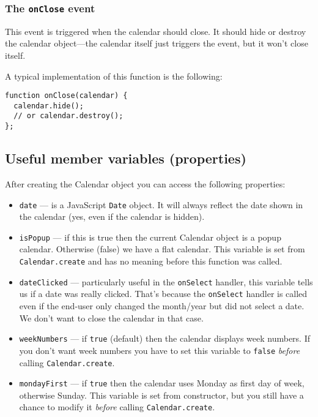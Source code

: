 \documentclass[a4paper,10pt]{article}
\begin{document}
\subsubsection*{The \texttt{onClose} event}\label{sec:Calendar.onClose}

This event is triggered when the calendar should close.  It should hide or
destroy the calendar object---the calendar itself just triggers the event, but
it won't close itself.

A typical implementation of this function is the following:

\begin{verbatim}
function onClose(calendar) {
  calendar.hide();
  // or calendar.destroy();
};
\end{verbatim}

\subsection{Useful member variables (properties)}\label{sec:Calendar.props}

After creating the Calendar object you can access the following properties:

\begin{itemize}

\item \texttt{date} --- is a JavaScript \texttt{Date} object.  It will always
reflect the date shown in the calendar (yes, even if the calendar is hidden).

\item \texttt{isPopup} --- if this is true then the current Calendar object is
a popup calendar.  Otherwise (false) we have a flat calendar.  This variable is
set from \texttt{Calendar.create} and has no meaning before this function was
called.

\item \texttt{dateClicked} --- particularly useful in the \texttt{onSelect}
handler, this variable tells us if a date was really clicked.  That's because
the \texttt{onSelect} handler is called even if the end-user only changed the
month/year but did not select a date.  We don't want to close the calendar in
that case.

\item \texttt{weekNumbers} --- if \texttt{true} (default) then the calendar
displays week numbers.  If you don't want week numbers you have to set this
variable to \texttt{false} \emph{before} calling \texttt{Calendar.create}.

\item \texttt{mondayFirst} --- if \texttt{true} then the calendar uses Monday
as first day of week, otherwise Sunday.  This variable is set from constructor,
but you still have a chance to modify it \emph{before} calling
\texttt{Calendar.create}.

\end{itemize}
\end{document}
